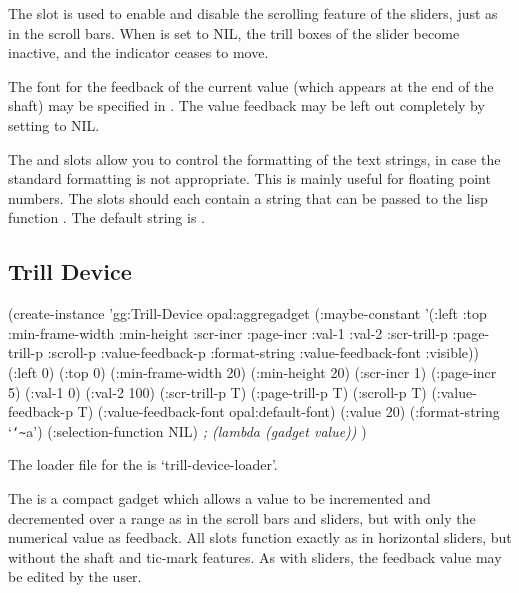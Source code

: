 The slot  is used to enable and disable the scrolling
feature of the sliders, just as in the scroll bars.  When
 is set to NIL, the trill boxes of the slider become
inactive, and the indicator ceases to move.

The font for the feedback of the current value (which appears at the
end of the shaft) may be specified in .  The
value feedback may be left out completely by setting
 to NIL.

The  and  slots allow you to
control the formatting of the text strings, in case the standard formatting
is not appropriate.  This is mainly useful for floating point numbers.
The slots should each contain a string that can be passed to the lisp function
.  The default string is .

\begin{group}
\section{Trill Device}
\label{trill-device}
\begin{programexample}
(create-instance 'gg:Trill-Device opal:aggregadget
   (:maybe-constant '(:left :top :min-frame-width :min-height :scr-incr :page-incr
                      :val-1 :val-2 :scr-trill-p :page-trill-p :scroll-p
                      :value-feedback-p :format-string :value-feedback-font :visible))
   (:left 0)
   (:top 0)
   (:min-frame-width 20)
   (:min-height 20)
   (:scr-incr 1)
   (:page-incr 5)
   (:val-1 0) (:val-2 100)
   (:scr-trill-p T)
   (:page-trill-p T)
   (:scroll-p T)
   (:value-feedback-p T)
   (:value-feedback-font opal:default-font)
   (:value 20)
   (:format-string `{\tt\char`\~}a')
   (:selection-function NIL)   {\it ; (lambda (gadget value))}
   )
\end{programexample}
\end{group}

\begin{center}
\end{center}

The loader file for the  is `trill-device-loader'.

The  is a compact gadget which allows a value to be
incremented and decremented over a range as in the scroll bars and
sliders, but with only the numerical value as feedback.  All slots
function exactly as in horizontal sliders, but without the shaft and
tic-mark features.  As with sliders, the feedback value may be edited
by the user.

